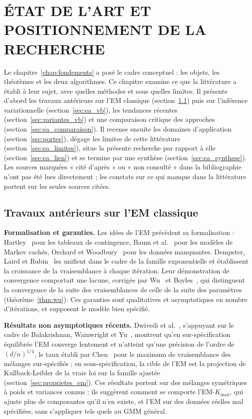 \chapter{ÉTAT DE L'ART ET POSITIONNEMENT DE LA RECHERCHE}\label{chap:etat_art}
Le chapitre~\ref{chap:fondements} a posé le cadre conceptuel : les objets, les théorèmes et les deux algorithmes. Ce chapitre examine ce que la littérature a établi à leur sujet, avec quelles méthodes et sous quelles limites. Il présente d'abord les travaux antérieurs sur l'EM classique (section~\ref{sec:ea_em}) puis sur l'inférence variationnelle (section~\ref{sec:ea_vb}), les tendances récentes (section~\ref{sec:variantes_vb}) et une comparaison critique des approches (section~\ref{sec:ea_comparaison}). Il recense ensuite les domaines d'application (section~\ref{sec:portee}), dégage les limites de cette littérature (section~\ref{sec:ea_limites}), situe la présente recherche par rapport à elle (section~\ref{sec:ea_lien}) et se termine par une synthèse (section~\ref{sec:ea_synthese}). Les sources marquées « cité d'après » ou « non consulté » dans la bibliographie n'ont pas été lues directement ; les constats sur ce qui manque dans la littérature portent sur les seules sources citées.

\section{Travaux antérieurs sur l'EM classique}\label{sec:ea_em}
\textbf{Formalisation et garanties. }Les idées de l'EM précèdent sa formalisation : Hartley~\cite{hartley1958} pour les tableaux de contingence, Baum et al.~\cite{baum1970} pour les modèles de Markov cachés, Orchard et Woodbury~\cite{orchard1972} pour les données manquantes. Dempster, Laird et Rubin~\cite{dempster1977} les unifient dans le cadre de la famille exponentielle et établissent la croissance de la vraisemblance à chaque itération. Leur démonstration de convergence comportait une lacune, corrigée par Wu~\cite{wu1983} et Boyles~\cite{boyles1983}, qui distinguent la convergence de la suite des vraisemblances de celle de la suite des paramètres (théorème~\ref{thm:wu}). Ces garanties sont qualitatives et asymptotiques en nombre d'itérations, et supposent le modèle bien spécifié.

\textbf{Résultats non asymptotiques récents. }Dwivedi et al.~\cite{dwivedi2020}, s'appuyant sur le cadre de Balakrishnan, Wainwright et Yu~\cite{balakrishnan2017}, montrent qu'en sur-spécification équilibrée l'EM converge lentement et n'atteint qu'une précision de l'ordre de $(d/n)^{1/4}$, le taux établi par Chen~\cite{chen1995} pour le maximum de vraisemblance des mélanges sur-spécifiés ; en sous-spécification, la cible de l'EM est la projection de Kullback-Leibler de la vraie loi sur la famille ajustée~\cite{dwivedi2018} (section~\ref{sec:proprietes_em}). Ces résultats portent sur des mélanges symétriques à poids et variances connus : ils suggèrent comment se comporte l'EM-$K_{\max}$, qui ajuste plus de composantes qu'il n'en existe, et l'EM sur des données réelles mal spécifiées, sans s'appliquer tels quels au GMM général.

